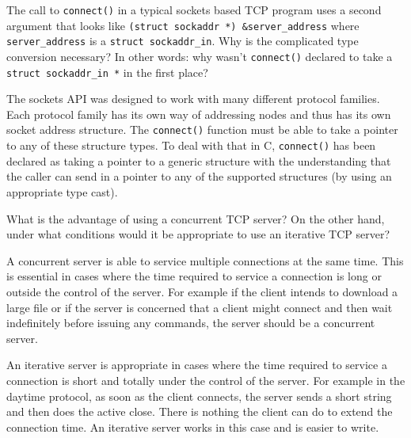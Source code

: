 \documentclass[12pt]{examdesign}
\begin{document}
\begin{shortanswer}

  \begin{question}
    The call to \texttt{connect()} in a typical sockets based TCP program uses a second argument
    that looks like \texttt{(struct sockaddr *) \&server\_address} where
    \texttt{server\_address} is a \texttt{struct sockaddr\_in}. Why is the complicated type
    conversion necessary? In other words: why wasn't \texttt{connect()} declared to take a
    \texttt{struct sockaddr\_in *} in the first place?

    \begin{answer}
      The sockets API was designed to work with many different protocol families. Each protocol
      family has its own way of addressing nodes and thus has its own socket address structure.
      The \texttt{connect()} function must be able to take a pointer to any of these structure
      types. To deal with that in C, \texttt{connect()} has been declared as taking a pointer to
      a generic structure with the understanding that the caller can send in a pointer to any of
      the supported structures (by using an appropriate type cast).
    \end{answer}
  \end{question}


  \begin{question}
    What is the advantage of using a concurrent TCP server? On the other hand, under what
    conditions would it be appropriate to use an iterative TCP server?

    \begin{answer}
      A concurrent server is able to service multiple connections at the same time. This is
      essential in cases where the time required to service a connection is long or outside the
      control of the server. For example if the client intends to download a large file or if
      the server is concerned that a client might connect and then wait indefinitely before
      issuing any commands, the server should be a concurrent server.

      An iterative server is appropriate in cases where the time required to service a
      connection is short and totally under the control of the server. For example in the
      daytime protocol, as soon as the client connects, the server sends a short string and then
      does the active close. There is nothing the client can do to extend the connection time.
      An iterative server works in this case and is easier to write.
    \end{answer}
  \end{question}


\end{shortanswer}
\end{document}
